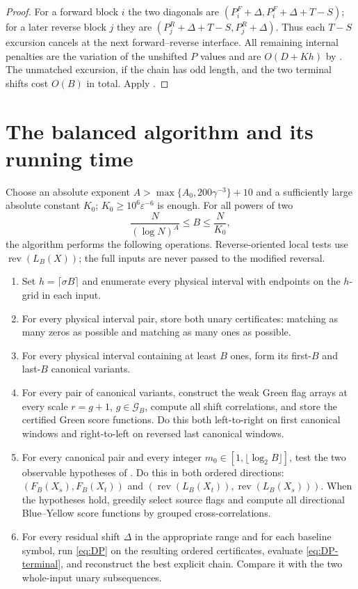 \documentclass[11pt]{article}
\theoremstyle{remark}
\newcommand{\rev}{\operatorname{rev}}
\newcommand{\eps}{\varepsilon}
\begin{document}
\begin{proof}
For a forward block $i$ the two diagonals are
$(P_i^F+\Delta,P_i^F+\Delta+T-S)$; for a later reverse block $j$ they are
$(P_j^R+\Delta+T-S,P_j^R+\Delta)$.  Thus each $T-S$ excursion cancels at the
next forward--reverse interface.  All remaining internal penalties are the
variation of the unshifted $P$ values and are $O(D+Kh)$ by
.  The unmatched excursion, if the chain has odd length, and
the two terminal shifts cost $O(B)$ in total.  Apply .
\end{proof}

\section{The balanced algorithm and its running time}
\label{sec:balanced-algorithm}

Choose an absolute exponent
$A>\max\{A_0,200\gamma^{-3}\}+10$ and a sufficiently large absolute
constant $K_0$; $K_0\ge10^6\eps^{-6}$ is enough.  For all powers of two
\begin{equation}\label{eq:B-range}
 \frac{N}{(\log N)^A}\le B\le\frac{N}{K_0},
\end{equation}
the algorithm performs the following operations.  Reverse-oriented local
tests use $\rev(L_B(X))$; the full inputs are never passed to the modified
reversal.

\begin{enumerate}[label=\arabic*.]
\item Set $h=\lceil\sigma B\rceil$ and enumerate every physical interval
      with endpoints on the $h$-grid in each input.
\item For every physical interval pair, store both unary certificates:
      matching as many zeros as possible and matching as many ones as
      possible.
\item For every physical interval containing at least $B$ ones, form its
      first-$B$ and last-$B$ canonical variants.
\item For every pair of canonical variants, construct the weak Green flag
      arrays at every scale $r=g+1$, $g\in\mathcal G_B$, compute all shift
      correlations, and store the certified Green score functions.  Do this
      both left-to-right on first canonical windows and right-to-left on
      reversed last canonical windows.
\item For every canonical pair and every integer
      $m_0\in[1,\lfloor\log_2 B\rfloor]$, test the two observable hypotheses
      of .  Do this in both ordered directions:
      $(F_B(X_s),F_B(X_t))$ and
      $(\rev(L_B(X_t)),\rev(L_B(X_s)))$.  When the hypotheses hold, greedily
      select source flags and compute all directional Blue--Yellow score
      functions by grouped cross-correlations.
\item For every residual shift $\Delta$ in the appropriate range and for
      each baseline symbol, run \eqref{eq:DP} on the resulting ordered
      certificates, evaluate \eqref{eq:DP-terminal}, and reconstruct the best
      explicit chain.  Compare it with the two whole-input unary
      subsequences.
\end{enumerate}
\end{document}
